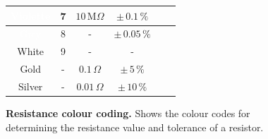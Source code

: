 {\begin{figure}[H]
\begin{minipage}[b]{1\textwidth}
{\begin{tabular}{|c|c|c|c|c|c|}
					\hline %
					\cellcolor{violet}\textcolor{white}{Violette}  & 7                      & $10\,\text{M}\Omega$   & $\pm\, 0.1\,\%$   \\ %
					\hline %
					\cellcolor{gray}\textcolor{white}{Grey}       & 8                      & -                      & $\pm\, 0.05\,\%$  \\ %
					\hline %
					White                                          & 9                      & -                      & -                 \\ %
					\hline %
					\cellcolor{gold}Gold                          & -                      & $0.1\,\Omega$          & $\pm\,5\,\%$      \\ %
					\hline %
					\cellcolor{silver}Silver                      & -                      & $0.01\,\Omega$         & $\pm\,10\,\%$     \\ %
					\hline %
				\end{tabular}%
			}
		\end{minipage}
		\caption{\textbf{Resistance colour coding.} Shows the colour codes for determining the resistance value and tolerance of a resistor.}
		\label{fig:Farbkodierung vom Widerstand}
	\end{figure}
	
}%




